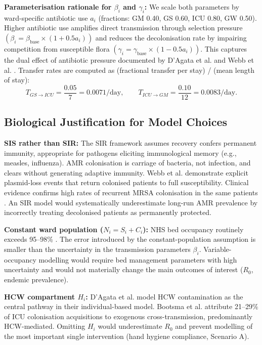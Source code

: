 \documentclass[12pt,a4paper]{article}
\begin{document}
\textbf{Parameterisation rationale for $\beta_i$ and $\gamma_i$:} We scale both parameters by ward-specific antibiotic use $a_i$ (fractions: GM 0.40, GS 0.60, ICU 0.80, GW 0.50). Higher antibiotic use amplifies direct transmission through selection pressure $\left(\beta_i = \beta_{\text{base}} \times (1 + 0.5 a_i)\right)$ and reduces the decolonisation rate by impairing competition from susceptible flora $\left(\gamma_i = \gamma_{\text{base}} \times (1 - 0.5 a_i)\right)$. This captures the dual effect of antibiotic pressure documented by D'Agata et al. \cite{dagata2007} and Webb et al. \cite{webb2005}. Transfer rates are computed as (fractional transfer per stay) / (mean length of stay):
\begin{equation}
\label{eq:3}
T_{GS \to ICU} = \frac{0.05}{7} = 0.0071 \text{/day}, \qquad
T_{ICU \to GM} = \frac{0.10}{12} = 0.0083 \text{/day}.
\end{equation}

\subsection{Biological Justification for Model Choices}

\textbf{SIS rather than SIR:} The SIR framework assumes recovery confers permanent immunity, appropriate for pathogens eliciting immunological memory (e.g., measles, influenza). AMR colonisation is carriage of bacteria, not infection, and clears without generating adaptive immunity. Webb et al. \cite{webb2005} demonstrate explicit plasmid-loss events that return colonised patients to full susceptibility. Clinical evidence confirms high rates of recurrent MRSA colonisation in the same patients \cite{dagata2007}. An SIR model would systematically underestimate long-run AMR prevalence by incorrectly treating decolonised patients as permanently protected.

\textbf{Constant ward population ($N_i = S_i + C_i$):} NHS bed occupancy routinely exceeds 95--98\% \cite{lipsitch2000}. The error introduced by the constant-population assumption is smaller than the uncertainty in the transmission parameters $\beta_i$. Variable-occupancy modelling would require bed management parameters with high uncertainty and would not materially change the main outcomes of interest ($R_0$, endemic prevalence).

\textbf{HCW compartment $H_i$:} D'Agata et al. \cite{dagata2007} model HCW contamination as the central pathway in their individual-based model. Bootsma et al. \cite{bootsma_preprint} attribute 21--29\% of ICU colonisation acquisitions to exogenous cross-transmission, predominantly HCW-mediated. Omitting $H_i$ would underestimate $R_0$ and prevent modelling of the most important single intervention (hand hygiene compliance, Scenario A).
\end{document}
